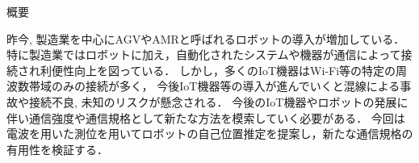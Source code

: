 \documentclass[main]{subfiles}
\begin{document}
\begin{center}
    \fontsize{15pt}{15pt}\selectfont
    概要
\end{center}

\vspace{30pt}
昨今, 製造業を中心にAGVやAMRと呼ばれるロボットの導入が増加している．
特に製造業ではロボットに加え，自動化されたシステムや機器が通信によって接続され利便性向上を図っている．
しかし，多くのIoT機器はWi-Fi等の特定の周波数帯域のみの接続が多く，
今後IoT機器等の導入が進んでいくと混線による事故や接続不良, 未知のリスクが懸念される．
今後のIoT機器やロボットの発展に伴い通信強度や通信規格として新たな方法を模索していく必要がある．
今回は電波を用いた測位を用いてロボットの自己位置推定を提案し，新たな通信規格の有用性を検証する．
\end{document}
